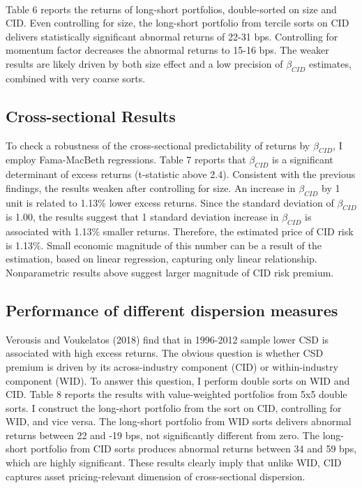 \documentclass[12pt]{article}
\begin{document}
\paragraph{}
Table 6 reports the returns of long-short portfolios, double-sorted on size and CID. Even controlling for size, the long-short portfolio from tercile sorts on CID delivers statistically significant abnormal returns of 22-31 bps. Controlling for momentum factor decreases the abnormal returns to 15-16 bps. The weaker results are likely driven by both size effect and a low precision of $\beta_{CID}$ estimates, combined with very coarse sorts.

\subsection{Cross-sectional Results}

To check a robustness of the cross-sectional predictability of returns by $\beta_{CID}$, I employ Fama-MacBeth regressions. Table 7 reports that $\beta_{CID}$ is a significant determinant of excess returns (t-statistic above 2.4). Consistent with the previous findings, the results weaken after controlling for size. An increase in $\beta_{CID}$ by 1 unit is related to 1.13\% lower excess returns. Since the standard deviation of $\beta_{CID}$ is 1.00, the results suggest that 1 standard deviation increase in $\beta_{CID}$ is associated with 1.13\% smaller returns. Therefore, the estimated price of CID risk is 1.13\%. Small economic magnitude of this number can be a result of the estimation, based on linear regression, capturing only linear relationship. Nonparametric results above suggest larger magnitude of CID risk premium.

\subsection{Performance of different dispersion measures}

Verousis and Voukelatos (2018) find that in 1996-2012 sample lower CSD is associated with high excess returns. The obvious question is whether CSD premium is driven by its across-industry component (CID) or within-industry component (WID). To answer this question, I perform double sorts on WID and CID. Table 8 reports the results with value-weighted portfolios from 5x5 double sorts. I construct the long-short portfolio from the sort on CID, controlling for WID, and vice versa. The long-short portfolio from WID sorts delivers abnormal returns between 22 and -19 bps, not significantly different from zero. The long-short portfolio from CID sorts produces abnormal returns between 34 and 59 bps, which are highly significant. These results clearly imply that unlike WID, CID captures asset pricing-relevant dimension of cross-sectional dispersion. 
\end{document}
